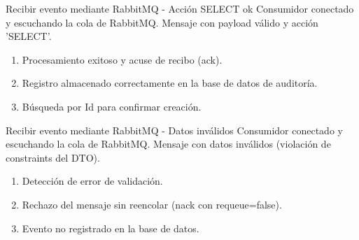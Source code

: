 {Recibir evento mediante RabbitMQ - Acción SELECT ok}
{Consumidor conectado y escuchando la cola de RabbitMQ.}
{Mensaje con payload válido y acción 'SELECT'.}
{\begin{enumerate} [leftmargin=*, nosep]
    \item Procesamiento exitoso y acuse de recibo (ack).
    \item Registro almacenado correctamente en la base de datos de auditoría.
    \item Búsqueda por Id para confirmar creación.
\end{enumerate}}

{Recibir evento mediante RabbitMQ - Datos inválidos}
{Consumidor conectado y escuchando la cola de RabbitMQ.}
{Mensaje con datos inválidos (violación de constraints del DTO).}
{\begin{enumerate} [leftmargin=*, nosep]
    \item Detección de error de validación.
    \item Rechazo del mensaje sin reencolar (nack con requeue=false).
    \item Evento no registrado en la base de datos.
\end{enumerate}}

